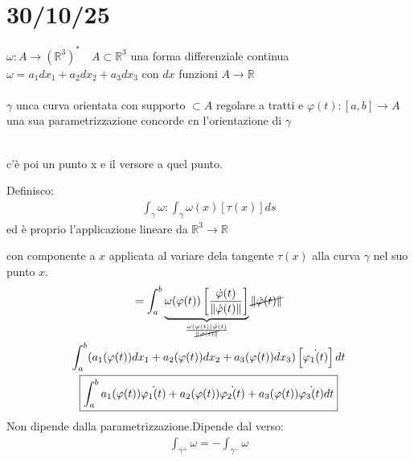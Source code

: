 \documentclass[a4paper, oneside]{article}
\begin{document}
\newpage
\section{30/10/25}
\begin{proposition}
     $\omega : A \to (\mathbb{R}^3)^* \quad A \subset \mathbb{R}^3$ una forma differenziale continua\\
     $\omega = a_1 dx_1 + a_2 dx_2 + a_3 dx_3$ con $dx$ funzioni $A \to \mathbb{R}$\\\\
     $\gamma$ unca curva orientata con supporto $\subset A$ regolare a tratti e  $\varphi(t):[a,b] \to A$ una sua parametrizzazione concorde cn l'orientazione di $\gamma$\\\\
    \begin{center}
        c'è poi un punto x e il versore a quel punto.
    \end{center}
    Definisco:
    \begin{gather*}
        \int_{\gamma} \omega: \int_{\gamma} \omega(x) [\tau(x)] ds
    \end{gather*}
    ed è proprio l'applicazione lineare da $\mathbb{R}^3 \to \mathbb{R}$
\end{proposition} con componente a $x$ applicata al variare dela tangente $\tau(x)$ alla curva $\gamma$ nel suo punto $x$.
\begin{gather*}
    = \int_{a}^{b} \underbrace{\omega(\varphi(t)) \left[ \frac{\dot{\varphi}(t) }{\left\lVert \dot{\varphi}(t)  \right\rVert }\right]}_{\frac{\omega(\varphi(t)) \dot{\varphi}(t)}{ \cancel{\left\lVert \dot{\varphi}(t) \right\rVert} }} \cancel{\left\lVert \dot{\varphi}(t) \right\rVert } \\
    \int_{a}^{b} (a_1(\varphi(t)) dx_1 + a_2(\varphi(t)) dx_2 + a_3(\varphi(t)) dx_3)\left[ \dot{\varphi_1(t)} \right] dt\\
    \boxed{\int_{a}^{b} a_1(\varphi(t)) \dot{\varphi_1(t)} + a_2(\varphi(t)) \dot{\varphi_2(t)} + a_3(\varphi(t)) \dot{\varphi_3(t)} dt}
\end{gather*}
Non dipende dalla parametrizzazione.Dipende dal verso:
\begin{gather*}
    \int_{\gamma^+} \omega = -\int_{\gamma^-} \omega
\end{gather*}
\end{document}
